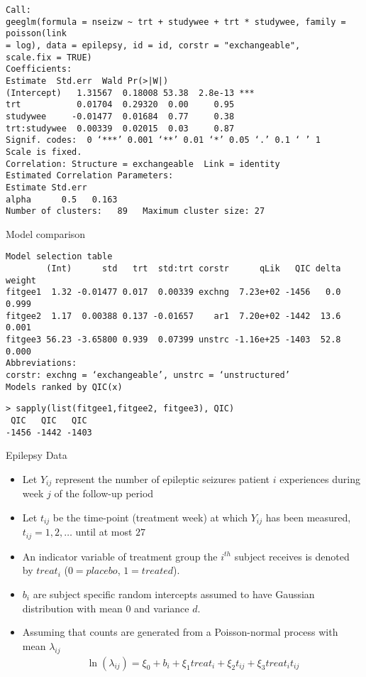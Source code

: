 \documentclass{beamer}
\begin{document}
\begin{frame}[fragile]
\scriptsize\begin{verbatim}
Call:
geeglm(formula = nseizw ~ trt + studywee + trt * studywee, family = poisson(link 
= log), data = epilepsy, id = id, corstr = "exchangeable", 
scale.fix = TRUE)
Coefficients:
Estimate  Std.err  Wald Pr(>|W|)    
(Intercept)   1.31567  0.18008 53.38  2.8e-13 ***
trt           0.01704  0.29320  0.00     0.95    
studywee     -0.01477  0.01684  0.77     0.38    
trt:studywee  0.00339  0.02015  0.03     0.87    
Signif. codes:  0 ‘***’ 0.001 ‘**’ 0.01 ‘*’ 0.05 ‘.’ 0.1 ‘ ’ 1
Scale is fixed.
Correlation: Structure = exchangeable  Link = identity 
Estimated Correlation Parameters:
Estimate Std.err
alpha      0.5   0.163
Number of clusters:   89   Maximum cluster size: 27 
\end{verbatim}
\end{frame}

\begin{frame} [fragile]
Model comparison
\scriptsize\begin{verbatim}
Model selection table 
        (Int)      std   trt  std:trt corstr      qLik   QIC delta weight
fitgee1  1.32 -0.01477 0.017  0.00339 exchng  7.23e+02 -1456   0.0  0.999
fitgee2  1.17  0.00388 0.137 -0.01657    ar1  7.20e+02 -1442  13.6  0.001
fitgee3 56.23 -3.65800 0.939  0.07399 unstrc -1.16e+25 -1403  52.8  0.000
Abbreviations:
corstr: exchng = ‘exchangeable’, unstrc = ‘unstructured’
Models ranked by QIC(x)
\end{verbatim}
 \scriptsize\begin{verbatim}
> sapply(list(fitgee1,fitgee2, fitgee3), QIC)
 QIC   QIC   QIC 
-1456 -1442 -1403 
\end{verbatim}
\end{frame}


\begin{frame}{Epilepsy Data}
\begin{itemize}
\item Let $Y_{ij}$ represent the number of epileptic seizures patient $i$ experiences during week $j$ of the follow-up period
\item Let $t_{ij}$ be the time-point (treatment week) at which $Y_{ij}$ has been measured, $t_{ij}= 1, 2, \ldots$ until at most $27$
\item An indicator variable of treatment group the $i^{th}$ subject receives is denoted by $treat_i$ ($0=placebo$, $1=treated$).
\item $b_i$ are subject specific random intercepts assumed to have Gaussian distribution with mean $0$ and variance $d$.
\item Assuming that counts are generated from a Poisson-normal process with mean $\lambda_{ij}$
\begin{eqnarray}
\ln(\lambda_{ij}) = \xi_0 + b_i +\xi_1 treat_i + \xi_2 t_{ij}+ \xi_3 treat_i t_{ij} \nonumber
\end{eqnarray}
\end{itemize}
\end{frame}
\end{document}
